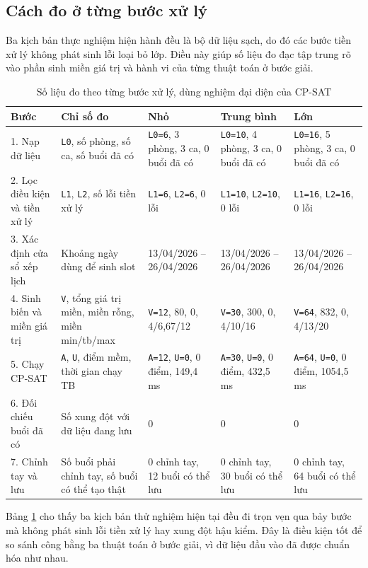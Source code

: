 \documentclass[../DoAn.tex]{subfiles}
\begin{document}
\subsection{Cách đo ở từng bước xử lý}
\noindent
Ba kịch bản thực nghiệm hiện hành đều là bộ dữ liệu sạch, do đó các bước tiền xử lý không phát sinh lỗi loại bỏ lớp. Điều này giúp số liệu đo đạc tập trung rõ vào phần sinh miền giá trị và hành vi của từng thuật toán ở bước giải.

\begin{table}[H]
\centering
\caption{Số liệu đo theo từng bước xử lý, dùng nghiệm đại diện của CP-SAT}
\label{table:bang5.7}
\scriptsize
\begin{tabular}{|l|p{3.3cm}|p{3.1cm}|p{3.1cm}|p{3.1cm}|}
\hline
\textbf{Bước} & \textbf{Chỉ số đo} & \textbf{Nhỏ} & \textbf{Trung bình} & \textbf{Lớn} \\ \hline
1. Nạp dữ liệu & \texttt{L0}, số phòng, số ca, số buổi đã có & \texttt{L0=6}, 3 phòng, 3 ca, 0 buổi đã có & \texttt{L0=10}, 4 phòng, 3 ca, 0 buổi đã có & \texttt{L0=16}, 5 phòng, 3 ca, 0 buổi đã có \\ \hline
2. Lọc điều kiện và tiền xử lý & \texttt{L1}, \texttt{L2}, số lỗi tiền xử lý & \texttt{L1=6}, \texttt{L2=6}, 0 lỗi & \texttt{L1=10}, \texttt{L2=10}, 0 lỗi & \texttt{L1=16}, \texttt{L2=16}, 0 lỗi \\ \hline
3. Xác định cửa sổ xếp lịch & Khoảng ngày dùng để sinh slot & 13/04/2026 -- 26/04/2026 & 13/04/2026 -- 26/04/2026 & 13/04/2026 -- 26/04/2026 \\ \hline
4. Sinh biến và miền giá trị & \texttt{V}, tổng giá trị miền, miền rỗng, miền min/tb/max & \texttt{V=12}, 80, 0, 4/6{,}67/12 & \texttt{V=30}, 300, 0, 4/10/16 & \texttt{V=64}, 832, 0, 4/13/20 \\ \hline
5. Chạy CP-SAT & \texttt{A}, \texttt{U}, điểm mềm, thời gian chạy TB & \texttt{A=12}, \texttt{U=0}, 0 điểm, 149{,}4 ms & \texttt{A=30}, \texttt{U=0}, 0 điểm, 432{,}5 ms & \texttt{A=64}, \texttt{U=0}, 0 điểm, 1054{,}5 ms \\ \hline
6. Đối chiếu buổi đã có & Số xung đột với dữ liệu đang lưu & 0 & 0 & 0 \\ \hline
7. Chỉnh tay và lưu & Số buổi phải chỉnh tay, số buổi có thể tạo thật & 0 chỉnh tay, 12 buổi có thể lưu & 0 chỉnh tay, 30 buổi có thể lưu & 0 chỉnh tay, 64 buổi có thể lưu \\ \hline
\end{tabular}
\end{table}

\noindent
Bảng \ref{table:bang5.7} cho thấy ba kịch bản thử nghiệm hiện tại đều đi trọn vẹn qua bảy bước mà không phát sinh lỗi tiền xử lý hay xung đột hậu kiểm. Đây là điều kiện tốt để so sánh công bằng ba thuật toán ở bước giải, vì dữ liệu đầu vào đã được chuẩn hóa như nhau.
\end{document}
